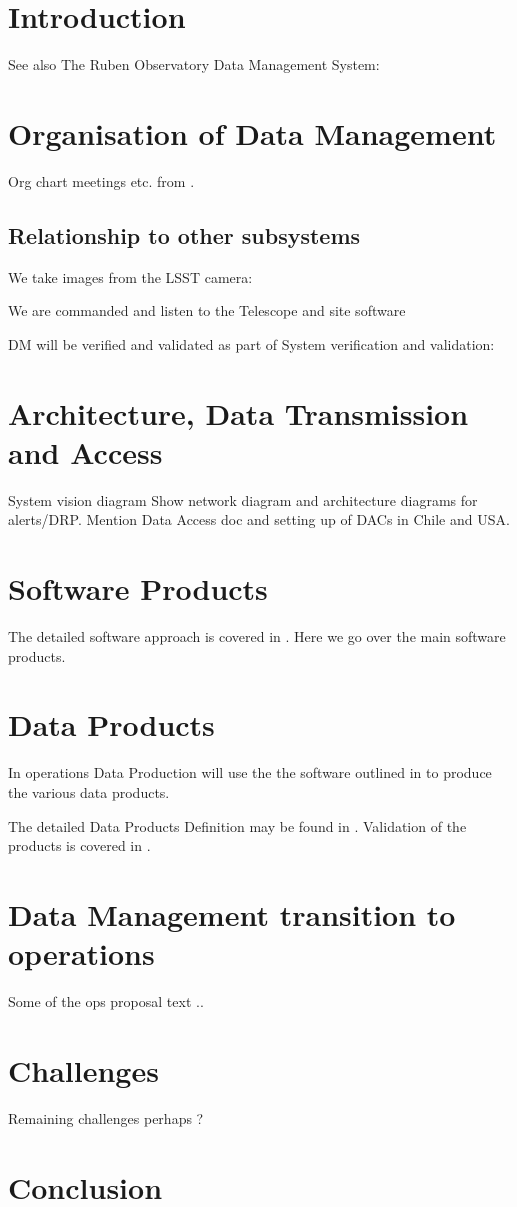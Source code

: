 \section{Introduction}

 See also The Ruben Observatory  Data Management System: \cite{2015arXiv151207914J}




\section{Organisation of Data Management} \label{sec:org}
Org chart meetings etc. from \cite{LDM-294}.

\subsection{Relationship to other subsystems}
   We take images from the  LSST camera: \cite{2010SPIE.7735E..0JK}

   We are commanded and listen to the  Telescope  and site software  \cite{2014SPIE.9145E..1AG}


   DM will be verified and validated as part of System verification and validation: \cite{2014SPIE.9150E..0NS}
\section {Architecture, Data Transmission and  Access } \label{sec:dataacess}
System vision diagram
Show network diagram and architecture diagrams for alerts/DRP. Mention Data Access doc  \cite{LDO-013} and
setting up of DACs in Chile and USA.

\section {Software Products} \label{sec:softproduts}
The detailed software approach is covered in \cite{PSTN-019}. Here we go over the main software products.


\section{Data Products} \label{sec:dataproducts}
In operations Data Production will use the the software outlined in  to produce the various data products.

 The detailed  Data Products Definition may be found in  \cite{LSE-163}.
Validation of the products is covered in \cite{PSTN-024}.



\section{ Data Management transition to operations} \label{sec:org}
Some of the ops proposal text ..
\section {Challenges }
Remaining challenges perhaps ?

\section{Conclusion}
